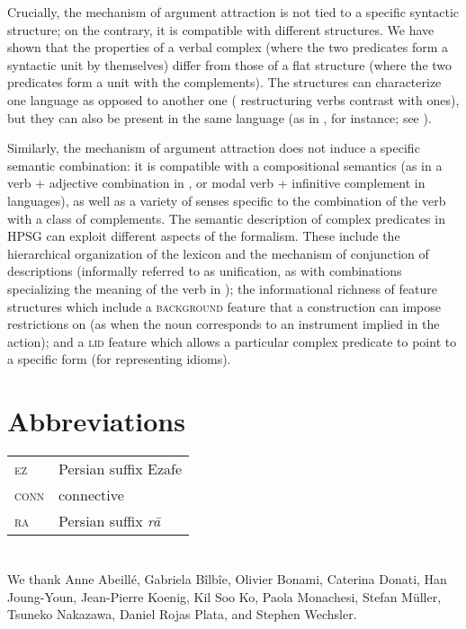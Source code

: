 Crucially, the mechanism of argument attraction is not tied to a specific syntactic structure; on
the contrary, it is compatible with different structures. We have shown that the properties of a
verbal complex (where the two predicates form a syntactic unit by themselves) differ from those of a
flat structure (where the two predicates form a unit with the complements). The structures can
characterize one language as opposed to another one ( restructuring verbs contrast with 
ones), but they can also be present in the same language (as in , for instance; see \citealt{Monachesi99b-u}). 

Similarly, the mechanism of argument attraction does not induce a specific semantic combination: it
is compatible with a compositional semantics (as in a verb + adjective combination in , or
modal verb + infinitive complement in  languages), as well as a variety of senses specific to
the combination of the verb with a class of complements. 
The semantic description of complex predicates in HPSG can exploit different aspects of the formalism.
These include the hierarchical organization of the lexicon and the mechanism of conjunction of descriptions (informally referred to as unification, as with combinations specializing the meaning of the verb in ); the informational richness of feature structures which include a \textsc{background} feature that a construction can impose restrictions on (as when the noun corresponds to an instrument implied in the action); and a \textsc{lid} feature which allows a particular complex predicate to point to a specific form (for representing idioms).    


\section*{Abbreviations}


\begin{tabularx}{.99\textwidth}{@{}lX}
\textsc{ez} & Persian suffix Ezafe \\
\textsc{conn} & connective\\
\textsc{ra} & Persian suffix \emph{rā}\\
\end{tabularx}




\section*{\acknowledgmentsUS}

We thank Anne Abeill\'e, Gabriela B\^ilb\^ie, Olivier Bonami, Caterina Donati, Han Joung-Youn, Jean-Pierre Koenig, Kil Soo Ko, Paola Monachesi, Stefan Müller, Tsuneko Nakazawa, Daniel Rojas Plata, and Stephen Wechsler. 

{\sloppy
	\printbibliography[heading=subbibliography,notkeyword=this]
}


